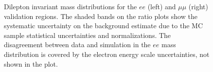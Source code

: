 \begin{figure}[htbp]
  \caption{Dilepton invariant mass distributions for the $ee$ (left) and $\mu\mu$ (right) validation regions. The shaded bands on the ratio plots show the systematic uncertainty on the background estimate due to the MC sample statistical uncertainties and normalizations. The disagreement between data and simulation in the $ee$ mass distribution is covered by the electron energy scale uncertainties, not shown in the plot.}
  \label{fig:model-independent-VR-dilepton}
\end{figure}


